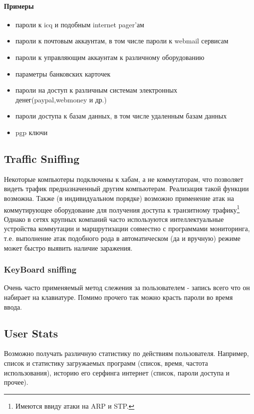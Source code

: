 \paragraph{Примеры}
\begin{itemize}
\item{пароли к icq и подобным internet pager'ам}
\item{пароли к почтовым аккаунтам, в том числе пароли к webmail сервисам}
\item{пароли к управляющим аккаунтам к различному оборудованию}
\item{параметры банковских карточек}
\item{пароли на доступ к различным системам электронных денег(paypal,webmoney и др.)}
\item{пароли доступа к базам данных, в том числе удаленным базам данных}
\item{pgp ключи}
\end{itemize}

\subsection{Traffic Sniffing}

Некоторые компьютеры подключены к хабам, а не коммутаторам, что
позволяет видеть трафик предназначенный другим компьютерам. Реализация
такой функции возможна. Также (в индивидуальном порядке) возможно
применение атак на коммутирующее оборудование для получения доступа к
транзитному трафику\footnote{Имеются ввиду атаки на ARP и STP.} Однако
в сетях крупных компаний часто используются интеллектуальные устройства
коммутации и маршрутизации совместно с программами мониторинга, т.е. выполнение
атак подобного рода в автоматическом (да и вручную) режиме может быстро
выявить наличие заражения.


\subsubsection{KeyBoard sniffing}

Очень часто применяемый метод слежения за пользователем - запись всего
что он набирает на клавиатуре. Помимо прочего так можно красть пароли
во время ввода.

\subsection{User Stats}

Возможно получать различную статистику по действиям пользователя.
Например, список и статистику загружаемых программ (список, время,
частота использования), историю его серфинга интернет (список, пароли
доступа и прочее).

